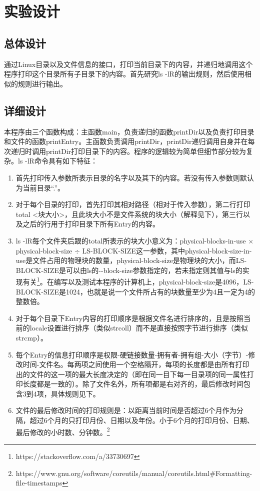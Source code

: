 \documentclass{report}
\begin{document}
\section{实验设计}
\label{sec:shi_yan_she_ji_4}

\subsection{总体设计}
\label{sub:zong_ti_she_ji_4}

通过Linux目录以及文件信息的接口，打印当前目录下的内容，并递归地调用这个程序打印这个目录所有子目录下的内容。首先研究ls -lR的输出规则，然后使用相似的规则进行输出。

\subsection{详细设计}
\label{sub:xiang_xi_she_ji_4}

本程序由三个函数构成：主函数main，负责递归的函数printDir以及负责打印目录和文件的函数printEntry。主函数负责调用printDir，printDir递归调用自身并在每次递归时调用printDir打印目录下的内容。程序的逻辑较为简单但细节部分较为复杂。ls -lR命令具有如下特征：
\begin{enumerate}
    \item 首先打印传入参数所表示目录的名字以及其下的内容。若没有传入参数则默认为当前目录``.''。
    \item 对于每个目录的打印，首先打印其相对路径（相对于传入参数），第二行打印total <块大小>，且此块大小不是文件系统的块大小（解释见下），第三行以及之后的行用于打印目录下所有Entry的内容。
    \item ls -lR每个文件夹后跟的total所表示的块大小意义为：physical-blocks-in-use $\times$ physical-block-size $\div$ LS-BLOCK-SIZE这一参数，其中physical-block-size-in-use是文件占用的物理块的数量，physical-block-size是物理块的大小，而LS-BLOCK-SIZE是可以由ls的-{}-block-size参数指定的，若未指定则其值与ls的实现有关\footnote{https://stackoverflow.com/a/33730697}。在编写以及测试本程序的计算机上，physical-block-size是4096，LS-BLOCK-SIZE是1024，也就是说一个文件所占有的块数量至少为4且一定为4的整数倍。
    \item 对于每个目录下Entry内容的打印顺序是根据文件名进行排序的，且是按照当前的locale设置进行排序（类似strcoll）而不是直接按照字节进行排序（类似strcmp）。
    \item 每个Entry的信息打印顺序是权限-硬链接数量-拥有者-拥有组-大小（字节）-修改时间-文件名。每两项之间使用一个空格隔开，每项的长度都是由所有打印出的文件的这一项的最大长度决定的（即在同一目下每一目录项的同一属性打印长度都是一致的）。除了文件名外，所有项都是右对齐的，最后修改时间包含3到4项，具体规则见下。
    \item 文件的最后修改时间的打印规则是：以距离当前时间是否超过6个月作为分隔，超过6个月的只打印月份、日期以及年份。小于6个月的打印月份、日期、最后修改的小时数、分钟数。\footnote{https://www.gnu.org/software/coreutils/manual/coreutils.html\#Formatting-file-timestamps}
\end{enumerate}
\end{document}
